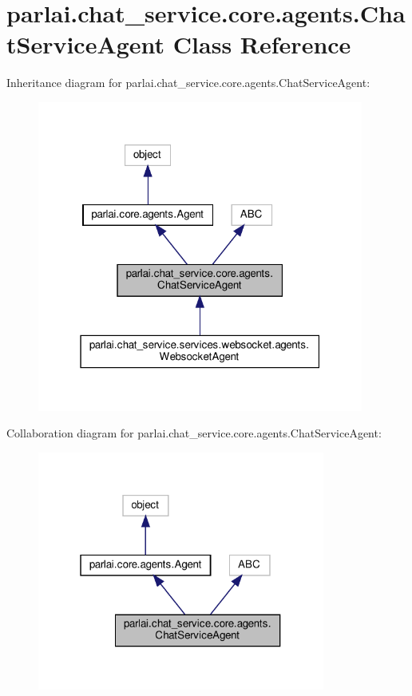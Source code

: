\hypertarget{classparlai_1_1chat__service_1_1core_1_1agents_1_1ChatServiceAgent}{}\section{parlai.\+chat\+\_\+service.\+core.\+agents.\+Chat\+Service\+Agent Class Reference}
\label{classparlai_1_1chat__service_1_1core_1_1agents_1_1ChatServiceAgent}


Inheritance diagram for parlai.\+chat\+\_\+service.\+core.\+agents.\+Chat\+Service\+Agent\+:
\nopagebreak
\begin{figure}[H]
\begin{center}
\leavevmode
\includegraphics[width=304pt]{classparlai_1_1chat__service_1_1core_1_1agents_1_1ChatServiceAgent__inherit__graph}
\end{center}
\end{figure}


Collaboration diagram for parlai.\+chat\+\_\+service.\+core.\+agents.\+Chat\+Service\+Agent\+:
\nopagebreak
\begin{figure}[H]
\begin{center}
\leavevmode
\includegraphics[width=268pt]{classparlai_1_1chat__service_1_1core_1_1agents_1_1ChatServiceAgent__coll__graph}
\end{center}
\end{figure}
